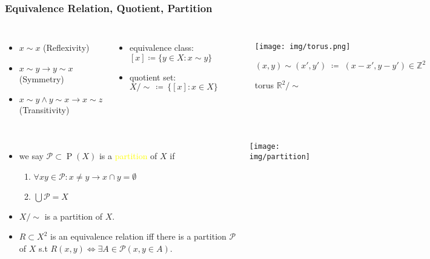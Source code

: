 \documentclass[UTF8,aspectratio=43,11pt,colorlinks,compress,openany]{beamer}%
\begin{document}
\begin{frame}\frametitle{Equivalence Relation, Quotient, Partition}
\begin{columns}
	\begin{itemize}
		\item $x\sim x$ \quad (Reflexivity)
		\item $x\sim y\to y\sim x$ \quad (Symmetry)
		\item $x\sim y\wedge y\sim x\to x\sim z$ \quad (Transitivity)
	\end{itemize}
\begin{itemize}
	\item equivalence class: $[x]\coloneqq \{y\in X: x\sim y\}$
	\item quotient set: $X/\sim\,\coloneqq \,\big\{[x]: x\in X\big\}$
\end{itemize}
\vspace{-6ex}
\begin{figure}[H]
\texttt{[image: img/torus.png]}\vspace{-5ex}\caption{torus $\mathbb{R}^2/\sim$}{\scriptsize $(x,y)\sim(x',y')\;\coloneqq \;(x-x',y-y')\in\mathbb{Z}^2$}
\end{figure}
\end{columns}
\begin{columns}
\begin{itemize}
	\item we say $\mathcal{P}\subset \operatorname{P}(X)$ is a \textcolor{yellow}{partition} of $X$ if
	\begin{enumerate}
		\item $\forall xy\in\mathcal{P}: x\neq y\to x\cap y=\emptyset$
		\item $\bigcup\mathcal{P}=X$
	\end{enumerate}
	\item $X/\sim$ is a partition of $X$.
	\item $R\subset X^2$ is an equivalence relation iff there is a partition $\mathcal{P}$ of $X$ s.t $R(x,y)\iff\exists A\in\mathcal{P} (x,y\in A)$.
\end{itemize}
\texttt{[image: img/partition]}
\end{columns}
\end{frame}
\end{document}
